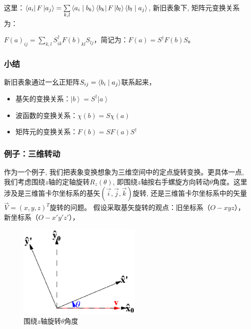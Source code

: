 这里：$\left\langle {a_i } \right|F\left| {a_j } \right\rangle  =
\sum\limits_{k,l} {\left\langle {{a_i }}
 \mathrel{\left | {\vphantom {{a_i } {b_k }}}
 \right. \kern-\nulldelimiterspace}
 {{b_k }} \right\rangle \left\langle {b_k } \right|F\left| {b_l } \right\rangle \left\langle {{b_l }}
 \mathrel{\left | {\vphantom {{b_l } {a_j }}}
 \right. \kern-\nulldelimiterspace}
 {{a_j }} \right\rangle } $, 新旧表象下, 矩阵元变换关系为：

$F(a)_{ij}  = \sum\limits_{k,l} {S_{ik}^\dag  F(b)_{kl} S_{lj} }
$，简记为：$F(a) = S^{\dagger} F(b) S$。

\subsubsection{小结}

新旧表象通过一幺正矩阵$S_{ij}  = \left\langle {{b_i }}
 \mathrel{\left | {\vphantom {{b_i } {a_j }}}
 \right. \kern-\nulldelimiterspace}
 {{a_j }} \right\rangle $联系起来，

\begin{itemize}
  \item 基矢的变换关系：$\left| b \right\rangle = S^{\dagger} \left| a \right\rangle$
  \item 波函数的变换关系：$\chi (b) = S \chi (a)$
  \item 矩阵元的变换关系：$F(b) = S F(a) S^{\dagger}$
\end{itemize}


\subsubsection{例子：三维转动}

作为一个例子,
我们把表象变换想象为三维空间中的定点旋转变换。更具体一点,
我们考虑围绕$z$轴的定轴旋转$R_z(\theta)$,
即围绕$z$轴按右手螺旋方向转动$\theta$角度。这里涉及是三维笛卡尔坐标系的基矢$(\vec
i, \vec j, \vec k)$旋转, 还是三维笛卡尔坐标系中的矢量$\vec V =
\left( {x,y,z} \right)^T $旋转的问题。
假设采取基矢旋转的观点：旧坐标系（$O-xyz$），新坐标系（$O-x'y'z'$），

\begin{figure}[h]
\begin{center}
\includegraphics[clip,width=6cm]{Notation/rotationfixpoint.ps}
\caption{围绕$z$轴旋转$\theta$角度}
\end{center}
\end{figure}

